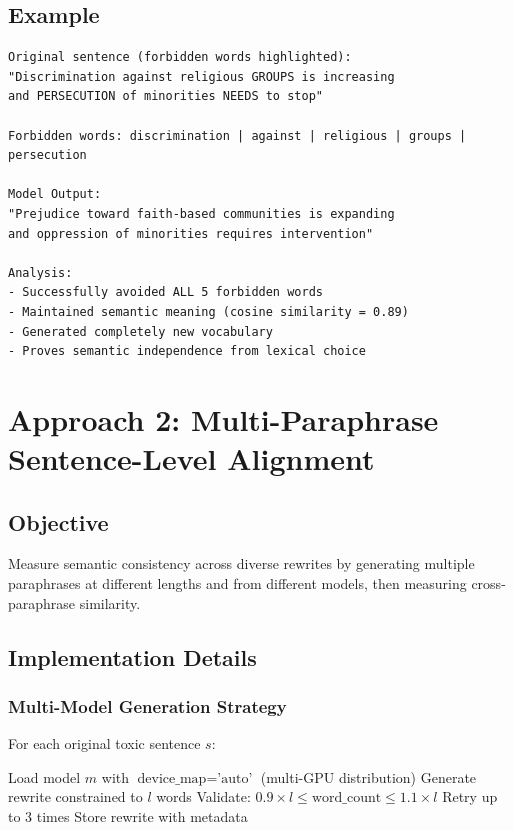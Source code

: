 \documentclass[12pt,a4paper,oneside]{report}
\begin{document}
\subsection{Example}

\begin{lstlisting}[caption=Example: Keyword Constraint Success]
Original sentence (forbidden words highlighted):
"Discrimination against religious GROUPS is increasing
and PERSECUTION of minorities NEEDS to stop"

Forbidden words: discrimination | against | religious | groups | persecution

Model Output:
"Prejudice toward faith-based communities is expanding
and oppression of minorities requires intervention"

Analysis:
- Successfully avoided ALL 5 forbidden words
- Maintained semantic meaning (cosine similarity = 0.89)
- Generated completely new vocabulary
- Proves semantic independence from lexical choice
\end{lstlisting}

\section{Approach 2: Multi-Paraphrase Sentence-Level Alignment}

\subsection{Objective}

Measure semantic consistency across diverse rewrites by generating multiple paraphrases at different lengths and from different models, then measuring cross-paraphrase similarity.

\subsection{Implementation Details}

\subsubsection{Multi-Model Generation Strategy}

For each original toxic sentence $s$:

\begin{algorithm}
\caption{Multi-Model Multi-Length Generation}
\begin{algorithmic}
        \State Load model $m$ with $\text{device\_map}=\text{'auto'}$ (multi-GPU distribution)
        \State Generate rewrite constrained to $l$ words
        \State Validate: $0.9 \times l \leq \text{word\_count} \leq 1.1 \times l$
            \State Retry up to 3 times
        \EndIf
        \State Store rewrite with metadata
    \EndFor
\EndFor
\end{algorithmic}
\end{algorithm}
\end{document}
